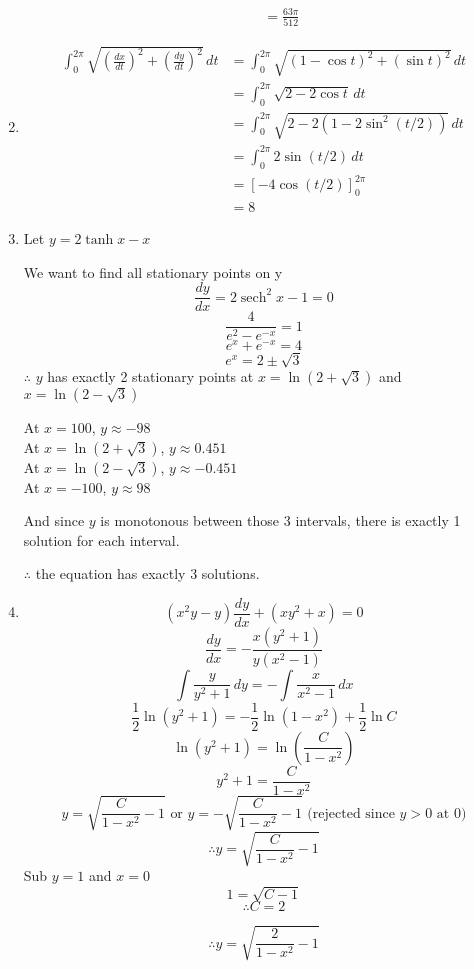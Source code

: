 \documentclass[12pt]{article}
\DeclareMathOperator{\sech}{sech}
\theoremstyle{definition}
\begin{document}
\begin{enumerate}
\begin{enumerate}
\begin{align*}
                            &= \frac{63\pi}{512}
                      \end{align*}
              \end{enumerate}
  \item \begin{align*}
          \int_0^{2\pi}\sqrt{\left(\frac{dx}{dt}\right)^2+\left(\frac{dy}{dt}\right)^2}\,dt &= \int_0^{2\pi}\sqrt{(1-\cos t)^2+(\sin t)^2}\,dt \\
            &= \int_0^{2\pi}\sqrt{2-2\cos t}\,dt \\
            &= \int_0^{2\pi}\sqrt{2-2(1-2\sin^2(t/2))}\,dt \\
            &= \int_0^{2\pi} 2\sin(t/2)\,dt \\
            &= [-4\cos(t/2)]_0^{2\pi} \\
            &= 8
        \end{align*}
  \item Let $y = 2\tanh x - x$
  
        We want to find all stationary points on y
        \[\frac{dy}{dx} = 2\sech ^2 x-1 = 0\]
        \[\frac{4}{e^2-e^{-x}}=1\]
        \[e^x+e^{-x}=4\]
        \[e^x = 2\pm \sqrt{3}\]
        $\therefore$ $y$ has exactly 2 stationary points at $x=\ln(2+\sqrt{3})$ and $x=\ln(2-\sqrt{3})$
        
        At $x=100$, $y\approx -98$ \\
        At $x=\ln(2+\sqrt{3})$, $y\approx 0.451$ \\
        At $x=\ln(2-\sqrt{3})$, $y\approx -0.451$ \\
        At $x=-100$, $y\approx 98$
        
        And since $y$ is monotonous between those 3 intervals, there is exactly 1 solution for each interval.
        
        $\therefore$ the equation has exactly 3 solutions.
  \item \[(x^2y-y)\frac{dy}{dx}+(xy^2+x)=0\]
        \[\frac{dy}{dx} = -\frac{x(y^2+1)}{y(x^2-1)}\]
        \[\int \frac{y}{y^2+1}\,dy = -\int \frac{x}{x^2-1}\,dx\]
        \[\frac{1}{2}\ln(y^2+1) = -\frac{1}{2}\ln(1-x^2) + \frac{1}{2}\ln C\]
        \[\ln(y^2+1) = \ln\left(\frac{C}{1-x^2}\right)\]
        \[y^2+1 = \frac{C}{1-x^2}\]
        \[y = \sqrt{\frac{C}{1-x^2} - 1} \text{ or } y = -\sqrt{\frac{C}{1-x^2} - 1} \text{ (rejected since $y>0$ at 0)}\]
        \[\therefore y = \sqrt{\frac{C}{1-x^2} - 1}\]
        Sub $y=1$ and $x=0$
        \[1 = \sqrt{C - 1}\]
        \[\therefore C=2\]
        
        \[\therefore y = \sqrt{\frac{2}{1-x^2} - 1}\]
        
\end{enumerate}
\end{document}
